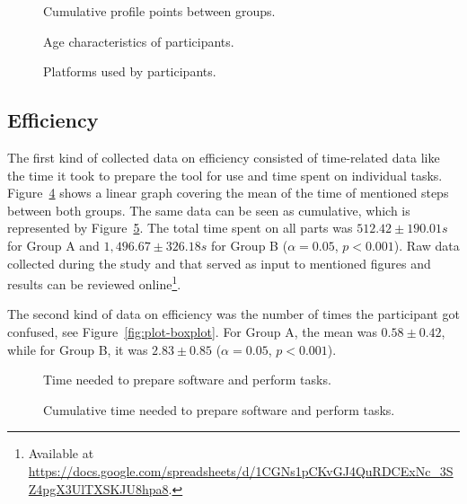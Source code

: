 \begin{figure}[H]
    
    \caption{Cumulative profile points between groups.}
    \label{fig:plot-points}
\end{figure}

\begin{figure}[H]
    
    \caption{Age characteristics of participants.}
    \label{fig:plot-age}
\end{figure}

\begin{figure}[H]
    
    \caption{Platforms used by participants.}
    \label{fig:plot-platform}
\end{figure}

\subsection{Efficiency}
\label{sec:evaluation-efficiency}

The first kind of collected data on efficiency consisted of time-related data like the time it took to prepare the tool for use and time spent on individual tasks.
Figure~\ref{fig:plot-linear} shows a linear graph covering the mean of the time of mentioned steps between both groups.
The same data can be seen as cumulative, which is represented by Figure~\ref{fig:plot-stacked-bar}.
The total time spent on all parts was $512.42 \pm 190.01 s$ for Group A and $1,496.67 \pm 326.18 s$ for Group B ($\alpha=0.05$, $p<0.001$).
Raw data collected during the study and that served as input to mentioned figures and results can be reviewed online\footnote{Available at \url{https://docs.google.com/spreadsheets/d/1CGNs1pCKvGJ4QuRDCExNc_3SZ4pgX3UlTXSKJU8hpa8}.}.

The second kind of data on efficiency was the number of times the participant got confused, see Figure~\ref{fig:plot-boxplot}.
For Group A, the mean was $0.58 \pm 0.42$, while for Group B, it was $2.83 \pm 0.85$ ($\alpha=0.05$, $p<0.001$).

\begin{figure}[H]
    
    \caption{Time needed to prepare software and perform tasks.}
    \label{fig:plot-linear}
\end{figure}

\begin{figure}[H]
    
    \caption{Cumulative time needed to prepare software and perform tasks.}
    \label{fig:plot-stacked-bar}
\end{figure}

